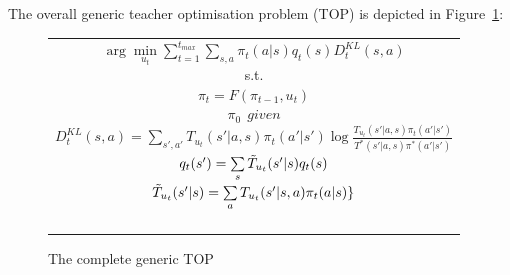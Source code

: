 \documentclass[letterpaper]{aamas2009}
\begin{document}
The overall generic teacher optimisation problem (TOP) is depicted in Figure~\ref{t_opt}:
\begin{figure}[ht]
\begin{tabular}{|c|} \hline \parbox{3.2 in} {\center 
$\arg\min\limits_{u_t}\sum\limits_{t=1}^{t_{max}}\sum\limits_{s,a}\pi_t(a|s)q_t(s)D^{KL}_t(s,a)$\\
s.t.\\
$\pi_t=F(\pi_{t-1},u_t)$\\
$\pi_0\ \ \displaystyle{given}$\\
$D^{KL}_t(s,a)=\sum\limits_{s',a'}T_{u_t}(s'|a,s)\pi_t(a'|s')\log\frac{T_{u_t}(s'|a,s)\pi_t(a'|s')}{T^*(s'|a,s)\pi^*(a'|s')}$\\
$q_t(s')=\sum\limits_s\Tilde{T}_{u_t}(s'|s)q_t(s)$\\
$\Tilde{T}_{u_t}(s'|s)=\sum\limits_aT_{u_t}(s'|s,a)\pi_t(a|s)\}$\\\ \\
}\\ \hline \end{tabular}
\caption{\label{t_opt}The complete generic TOP}
\end{figure}
\end{document}
